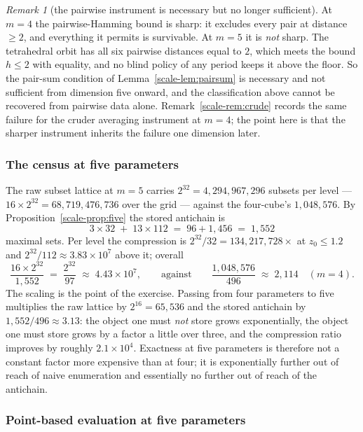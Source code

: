 \documentclass[10pt,twocolumn]{article}
\theoremstyle{plain}
\theoremstyle{definition}
\theoremstyle{remark}
\newtheorem{remark}[theorem]{Remark}
\begin{document}
\begin{remark}[the pairwise instrument is necessary but no longer sufficient]
\label{scale-rem:notsuff}
At \(m = 4\) the pairwise-Hamming bound is sharp: it excludes every pair at distance
\(\ge 2\), and everything it permits is survivable. At \(m = 5\) it is \emph{not} sharp. The
tetrahedral orbit has all six pairwise distances equal to \(2\), which meets the bound
\(h \le 2\) with equality, and no blind policy of any period keeps it above the floor. So
the pair-sum condition of Lemma~\ref{scale-lem:pairsum} is necessary and not sufficient from
dimension five onward, and the classification above cannot be recovered from pairwise data
alone. Remark~\ref{scale-rem:crude} records the same failure for the cruder averaging instrument
at \(m = 4\); the point here is that the sharper instrument inherits the failure one
dimension later.
\end{remark}

\subsubsection{The census at five parameters}

The raw subset lattice at \(m = 5\) carries \(2^{32} = 4{,}294{,}967{,}296\) subsets per
level --- \(16 \times 2^{32} = 68{,}719{,}476{,}736\) over the grid --- against the
four-cube's \(1{,}048{,}576\). By Proposition~\ref{scale-prop:five} the stored antichain is
\[
3 \times 32 \;+\; 13 \times 112 \;=\; 96 + 1{,}456 \;=\; 1{,}552
\]
maximal sets. Per level the compression is \(2^{32}/32 = 134{,}217{,}728\times\) at
\(z_{0} \le 1.2\) and \(2^{32}/112 \approx 3.83 \times 10^{7}\) above it; overall
\[
\frac{16 \times 2^{32}}{1{,}552} \;=\; \frac{2^{32}}{97} \;\approx\; 4.43 \times 10^{7},
\qquad\text{against}\qquad
\frac{1{,}048{,}576}{496} \;\approx\; 2{,}114 \quad (m = 4).
\]
The scaling is the point of the exercise. Passing from four parameters to five multiplies
the raw lattice by \(2^{16} = 65{,}536\) and the stored antichain by \(1{,}552/496 \approx
3.13\): the object one must \emph{not} store grows exponentially, the object one must store
grows by a factor a little over three, and the compression ratio improves by roughly
\(2.1 \times 10^{4}\). Exactness at five parameters is therefore not a constant factor more
expensive than at four; it is exponentially further out of reach of naive enumeration and
essentially no further out of reach of the antichain.

\subsubsection{Point-based evaluation at five parameters}
\end{document}
